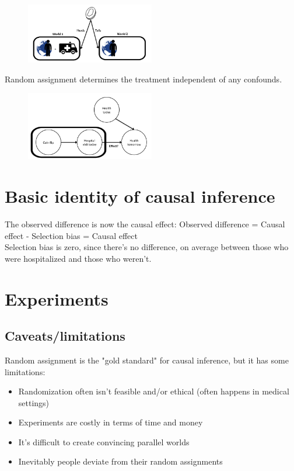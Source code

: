 \begin{figure}[ht]
  \begin{center}
    \includegraphics[width=0.5\textwidth]{figures/random_assignment.png}
  \end{center}
\end{figure}

Random assignment determines the treatment independent of any confounds.
\begin{figure}[ht]
  \begin{center}
    \includegraphics[width=0.5\textwidth]{figures/random_assignment_2.png}
  \end{center}
\end{figure}

\section{Basic identity of causal inference}
The observed difference is now the causal effect: Observed difference = Causal effect - Selection bias = Causal effect
\\ Selection bias is zero, since there's no difference, on average between those who were hospitalized and those who weren't.

\section{Experiments}
\subsection{Caveats/limitations}
Random assignment is the "gold standard" for causal inference, but it has some limitations:
\begin{itemize}
  \item Randomization often isn't feasible and/or ethical (often happens in medical settings)
  \item Experiments are costly in terms of time and money
  \item It's difficult to create convincing parallel worlds
  \item Inevitably people deviate from their random assignments
\end{itemize}
